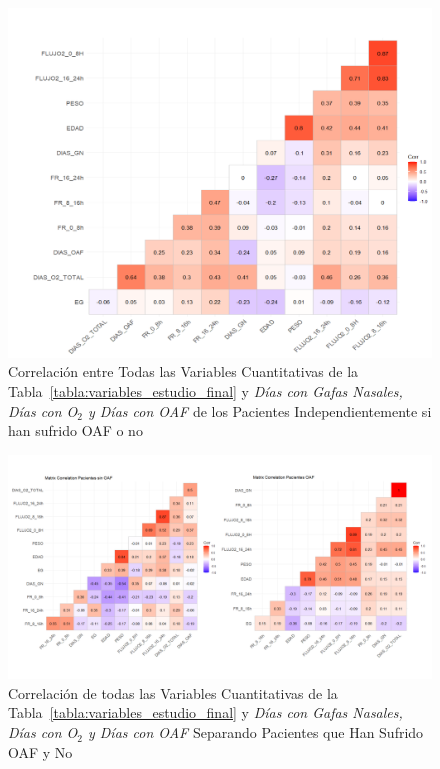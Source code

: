 \begin{figure}[H]
    \centering
    \includegraphics[scale = 0.7]{./img/corr.png}
    \caption{Correlación entre Todas las Variables Cuantitativas de la Tabla~\ref{tabla:variables_estudio_final} y \textit{Días con Gafas Nasales, Días con O$_2$ y Días con OAF} de los Pacientes Independientemente si han sufrido OAF o no}\label{fig:corr}
\end{figure}

\thispagestyle{empty}
\begin{landscape}
\begin{figure}[H]
    \centering
    \includegraphics[scale = 0.7]{./img/corrOAFnoOAF.png}
    \caption{Correlación de todas las Variables Cuantitativas de la Tabla~\ref{tabla:variables_estudio_final} y \textit{Días con Gafas Nasales, Días con O$_2$ y Días con OAF} Separando Pacientes que Han Sufrido OAF y No}\label{fig:corrOAFnoOAF}
\end{figure}
\end{landscape}
\restoregeometry

